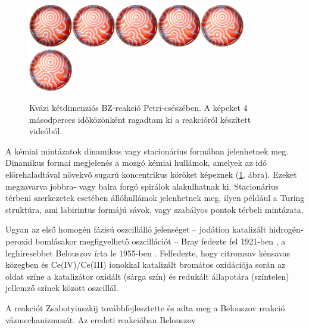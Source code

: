\begin{figure}[!h]
\def\s{0.17}
\centering
\includegraphics[width=\s\textwidth]{img/sequence/0001.png}\includegraphics[width=\s\textwidth]{img/sequence/0111.png}\includegraphics[width=\s\textwidth]{img/sequence/0221.png}\includegraphics[width=\s\textwidth]{img/sequence/0331.png}\includegraphics[width=\s\textwidth]{img/sequence/0441.png}\includegraphics[width=\s\textwidth]{img/sequence/0551.png}
\caption{Kvázi kétdimenziós BZ-reakció Petri-csészében. A képeket 4 másodperces időközönként ragadtam ki a reakcióról készített videóból.}
\label{fig:bzsequence}
\end{figure}

A kémiai mintázatok dinamikus vagy stacionárius formában jelenhetnek meg. Dinamikus formai megjelenés a mozgó kémiai hullámok, amelyek az idő előrehaladtával növekvő sugarú koncentrikus köröket képeznek (\ref{fig:bzsequence}. ábra). Ezeket megzavarva jobbra- vagy balra forgó spirálok alakulhatnak ki.
Stacionárius térbeni szerkezetek esetében állóhullámok jelenhetnek meg, ilyen például a Turing struktúra, ami labirintus formájú sávok, vagy szabályos pontok térbeli mintázata.

Ugyan az első homogén fázisú oszcillálló jelenséget -- jodátion katalizált hidrogén-peroxid bomlásakor megfigyelhető oszcillációt -- Bray fedezte fel 1921-ben \cite{bray1921periodic}, a leghíresebbet Belouszov írta le 1955-ben \cite{belousov1959collection}. Felfedezte, hogy citromsav kénsavas közegben és Ce(IV)/Ce(III) ionokkal katalizált bromátos oxidációja során az oldat színe a katalizátor oxidált (sárga szín) és redukált állapotára (színtelen) jellemző színek között oszcillál.

A reakciót Zsabotyinszkij továbbfejlesztette és adta meg a Belouszov reakció vázmechanizmusát.\cite{zhabotinsky1964periodical} Az eredeti reakcióban Belouszov 